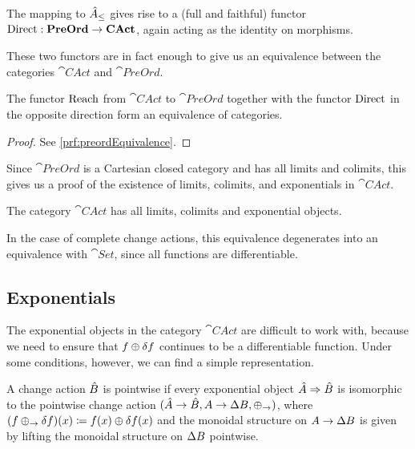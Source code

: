 The mapping to $\hat{A}_\leq$ gives rise to a (full and faithful) functor
$\operatorname{Direct} : \mathbf{PreOrd} \rightarrow \mathbf{CAct}$, again acting as the identity on morphisms.

These two functors are in fact enough to give us an equivalence between the categories
$\cat{CAct}$ and $\cat{PreOrd}$.

\begin{thm}[name=Equivalence of $\cat{CAct}$ and $\cat{PreOrd}$, restate=preordEquivalence]
  \label{thm:preordEquivalence}
  The functor $\operatorname{Reach}$ from $\cat{CAct}$ to $\cat{PreOrd}$ together with the
  functor $\operatorname{Direct}$ in the opposite direction form an equivalence of categories.
\end{thm}
\ifproofs
\begin{proof}
  See \cref{prf:preordEquivalence}.
\end{proof}
\fi

Since $\cat{PreOrd}$ is a Cartesian closed category and has all limits and
colimits, this gives us a proof of the existence of limits, colimits, and exponentials in $\cat{CAct}$.

\begin{corollary}
  The category $\cat{CAct}$ has all limits, colimits and exponential objects.
\end{corollary}

In the case of complete change actions, this equivalence degenerates into an
equivalence with $\cat{Set}$, since all functions are differentiable.

\subsection{Exponentials}

The exponential objects in the category $\cat{CAct}$ are difficult to work with,
because we need to ensure that $f \oplus \delta f$ continues to be a
differentiable function. Under some
conditions, however, we can find a simple representation.

\begin{defn}
  \label{def:pointwiseChanges}
  A change action $\hat{B}$ is pointwise if every exponential object
  ${\hat{A}} \Rightarrow {\hat{B}}$ is isomorphic to the pointwise change action
  $(\hat{A} \rightarrow \hat{B},A \rightarrow \Delta B,\oplus_\rightarrow)$,
  where $(f \oplus_\rightarrow \delta f)(x) \coloneqq f(x) \oplus \delta f(x)$ and the
  monoidal structure on $A \rightarrow \Delta B$ is given by lifting
  the monoidal structure on $\Delta B$ pointwise.
\end{defn}

